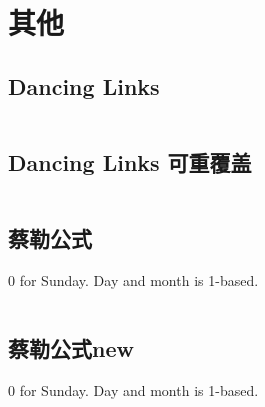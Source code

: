 \chapter{其他}
\section{Dancing Links}
\inputminted{cpp}{\source/others/dancing-links.cpp}
\section{Dancing Links 可重覆盖}
\inputminted{cpp}{\source/others/zellers-congruence-multi.cpp}
\section{蔡勒公式}
0 for Sunday. Day and month is 1-based.
\inputminted{cpp}{\source/others/zellers-congruence.cpp}
\section{蔡勒公式new}
0 for Sunday. Day and month is 1-based.
\inputminted{cpp}{\source/others/zeller.cpp}
